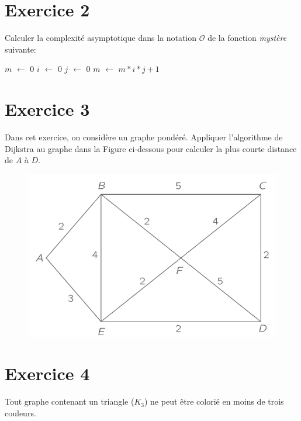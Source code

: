 \documentclass{article}[12pt]
\newcommand*\Let[2]{\State #1 $\gets$ #2}
\begin{document}
\section*{Exercice 2}
  Calculer la complexité asymptotique dans la notation $\mathcal{O}$ de la fonction \textit{mystère} suivante:
  
  
  \begin{tcolorbox}
         \begin{algorithmic}[1]
    \Let{$m$}{0}
    \Let{$i$}{0}
    \Let{$j$}{0}
            \Let{$m$}{$ m * i * j + 1$}
        \EndFor
    \EndFor
  \EndFunction
  \end{algorithmic}
\end{tcolorbox}


\section*{Exercice 3}

Dans cet exercice, on considère un graphe pondéré. Appliquer l'algorithme de Dijkstra au graphe dans la Figure ci-dessous pour calculer la plus courte distance de $A$ à $D$.

\begin{figure}[h!] 
  \centering
\includegraphics[scale =0.3]{Djikstra.png} \label{fig:grapheDijkstra}
\end{figure}


\section*{Exercice 4}

Tout graphe contenant un triangle ($K_3$) ne peut être colorié en moins de trois couleurs.
\end{document}

